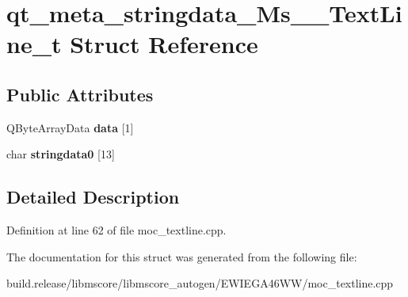 \hypertarget{structqt__meta__stringdata___ms_____text_line__t}{}\section{qt\+\_\+meta\+\_\+stringdata\+\_\+\+Ms\+\_\+\+\_\+\+Text\+Line\+\_\+t Struct Reference}
\label{structqt__meta__stringdata___ms_____text_line__t}
\subsection*{Public Attributes}
\begin{DoxyCompactItemize}
\item 
\mbox{\label{structqt__meta__stringdata___ms_____text_line__t_a5b58f99d7cad123c513604828eb11161}} 
Q\+Byte\+Array\+Data {\bfseries data} \mbox{[}1\mbox{]}
\item 
\mbox{\label{structqt__meta__stringdata___ms_____text_line__t_a44638cc3ac0152f0cbd63eb9acb046a6}} 
char {\bfseries stringdata0} \mbox{[}13\mbox{]}
\end{DoxyCompactItemize}


\subsection{Detailed Description}


Definition at line 62 of file moc\+\_\+textline.\+cpp.



The documentation for this struct was generated from the following file\+:\begin{DoxyCompactItemize}
\item 
build.\+release/libmscore/libmscore\+\_\+autogen/\+E\+W\+I\+E\+G\+A46\+W\+W/moc\+\_\+textline.\+cpp\end{DoxyCompactItemize}

